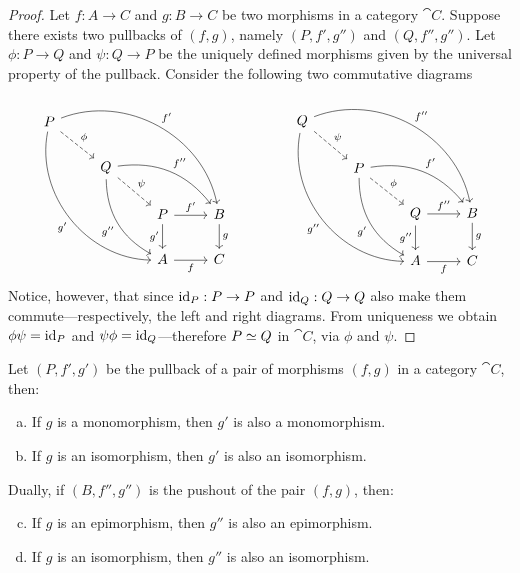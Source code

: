 \begin{proof}
Let \(f: A \to C\) and \(g: B \to C\) be two morphisms in a category \(\cat
C\). Suppose there exists two pullbacks of \((f, g)\), namely \((P, f', g'')\)
and \((Q, f'', g'')\). Let \(\phi: P \to Q\) and \(\psi: Q \to P\) be the
uniquely defined morphisms given by the universal property of the
pullback. Consider the following two commutative diagrams
\[
\begin{tikzcd}
P \ar[rd, dashed, "\phi"]
\ar[rrrdd, bend left=50, "f'"]
\ar[ddrrd, bend right=50, "g'"']
& & &
\\
&Q \ar[dr, dashed, "\psi"]
\ar[rrd, bend left, "f''"]
\ar[drd, bend right, "g''"']
& &
\\
& &P \ar[r, "f'"] \ar[d, "g'"']
&B \ar[d, "g"]
\\
& &A \ar[r, "f"'] &C
\end{tikzcd}
\qquad \qquad
\begin{tikzcd}
Q \ar[rd, dashed, "\psi"]
\ar[rrrdd, bend left=50, "f''"]
\ar[ddrrd, bend right=50, "g''"']
& & &
\\
&P \ar[dr, dashed, "\phi"]
\ar[rrd, bend left, "f'"]
\ar[drd, bend right, "g'"']
& &
\\
& &Q \ar[r, "f''"] \ar[d, "g''"']
&B \ar[d, "g"]
\\
& &A \ar[r, "f"'] &C
\end{tikzcd}
\]
Notice, however, that since \(\operatorname{id}_P: P \to P\) and \(\operatorname{id}_Q: Q \to Q\) also make
them commute---respectively, the left and right diagrams. From uniqueness we
obtain \(\phi \psi = \operatorname{id}_P\) and \(\psi \phi = \operatorname{id}_Q\)---therefore \(P \simeq
Q\) in \(\cat C\), via \(\phi\) and \(\psi\).
\end{proof}

\begin{proposition}
\label{prop:preservation-monic-epic-iso-by-pull-push}
Let \((P, f', g')\) be the pullback of a pair of morphisms \((f, g)\) in a
category \(\cat C\), then:
\begin{enumerate}[(a)]\setlength\itemsep{0em}
\item If \(g\) is a monomorphism, then \(g'\) is also a monomorphism.
\item If \(g\) is an isomorphism, then \(g'\) is also an isomorphism.
\end{enumerate}
Dually, if \((B, f'', g'')\) is the pushout of the pair \((f, g)\), then:
\begin{enumerate}[(a)]\setcounter{enumi}{2}\setlength\itemsep{0em}
\item If \(g\) is an epimorphism, then \(g''\) is also an epimorphism.
\item If \(g\) is an isomorphism, then \(g''\) is also an isomorphism.
\end{enumerate}
\end{proposition}

